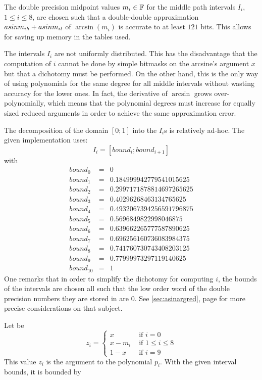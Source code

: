 The double precision midpoint values $m_i \in \mathbb {F}$ for the middle path
intervals $I_i$, $1 \leq i \leq 8$, are chosen such that a
double-double approximation $asinm_{i\mathit{h}} + asinm_{i\mathit{l}}$ of
$\arcsin\left( m_i \right)$ is accurate to at least $121$ bits. This
allows for saving up memory in the tables used.

The intervals $I_i$ are not uniformly distributed. This has the
disadvantage that the computation of $i$ cannot be done by simple
bitmasks on the arcsine's argument $x$ but that a dichotomy must be
performed. On the other hand, this is the only way of using
polynomials for the same degree for all middle intervals without
wasting accuracy for the lower ones. In fact, the derivative of
$\arcsin$ grows over-polynomially, which means that the polynomial
degrees must increase for equally sized reduced arguments in order to
achieve the same approximation error. 

The decomposition of the domain $\left[0;1\right]$ into the $I_i$s is
relatively ad-hoc. The given implementation uses:
$$I_i = \left[bound_i;bound_{i+1}\right]$$
with
\begin{eqnarray*}
bound_0 & = & 0 \\
bound_1 & = & 0.184999942779541015625  \\
bound_2 & = & 0.2997171878814697265625  \\
bound_3 & = & 0.40296268463134765625  \\
bound_4 & = & 0.4932067394256591796875  \\
bound_5 & = & 0.5696849822998046875  \\
bound_6 & = & 0.639662265777587890625  \\
bound_7 & = & 0.696256160736083984375 \\
bound_8 & = & 0.741760730743408203125  \\
bound_9 & = & 0.77999973297119140625  \\
bound_{10} & = & 1 
\end{eqnarray*}
One remarks that in order to simplify the dichotomy for computing $i$,
the bounds of the intervals are chosen all such that the low order
word of the double precision numbers they are stored in are $0$. See
\ref{sec:asinargred}, page \pageref{sec:asinargred} for more precise
considerations on that subject.

Let be
$$z_i = \left \lbrace \begin{array}{ll} x & \mbox{ if } i = 0 \\
x - m_i & \mbox{ if } 1 \leq i \leq 8 \\
1 - x & \mbox{ if } i = 9 \end{array} \right.$$
This value $z_i$ is the argument to the polynomial $p_i$. With the given interval bounds, it is bounded by 

